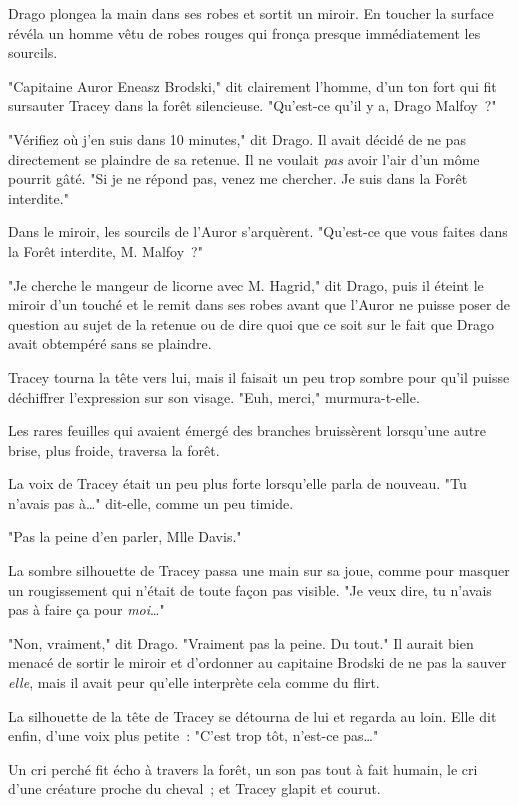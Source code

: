 Drago plongea la main dans ses robes et sortit un miroir. En toucher la surface révéla un homme vêtu de robes rouges qui fronça presque immédiatement les sourcils.

"Capitaine Auror Eneasz Brodski," dit clairement l'homme, d'un ton fort qui fit sursauter Tracey dans la forêt silencieuse. "Qu'est-ce qu'il y a, Drago Malfoy~?"

"Vérifiez où j'en suis dans 10 minutes," dit Drago. Il avait décidé de ne pas directement se plaindre de sa retenue. Il ne voulait \emph{pas} avoir l'air d'un môme pourrit gâté. "Si je ne répond pas, venez me chercher. Je suis dans la Forêt interdite."

Dans le miroir, les sourcils de l'Auror s'arquèrent. "Qu'est-ce que vous faites dans la Forêt interdite, M. Malfoy~?"

"Je cherche le mangeur de licorne avec M. Hagrid," dit Drago, puis il éteint le miroir d'un touché et le remit dans ses robes avant que l'Auror ne puisse poser de question au sujet de la retenue ou de dire quoi que ce soit sur le fait que Drago avait obtempéré sans se plaindre.

Tracey tourna la tête vers lui, mais il faisait un peu trop sombre pour qu'il puisse déchiffrer l'expression sur son visage. "Euh, merci," murmura-t-elle.

Les rares feuilles qui avaient émergé des branches bruissèrent lorsqu'une autre brise, plus froide, traversa la forêt.

La voix de Tracey était un peu plus forte lorsqu'elle parla de nouveau. "Tu n'avais pas à…" dit-elle, comme un peu timide.

"Pas la peine d'en parler, Mlle Davis."

La sombre silhouette de Tracey passa une main sur sa joue, comme pour masquer un rougissement qui n'était de toute façon pas visible. "Je veux dire, tu n'avais pas à faire ça pour \emph{moi}…"

"Non, vraiment," dit Drago. "Vraiment pas la peine. Du tout." Il aurait bien menacé de sortir le miroir et d'ordonner au capitaine Brodski de ne pas la sauver \emph{elle}, mais il avait peur qu'elle interprète cela comme du flirt.

La silhouette de la tête de Tracey se détourna de lui et regarda au loin. Elle dit enfin, d'une voix plus petite~: "C'est trop tôt, n'est-ce pas…"

Un cri perché fit écho à travers la forêt, un son pas tout à fait humain, le cri d'une créature proche du cheval~; et Tracey glapit et courut.

